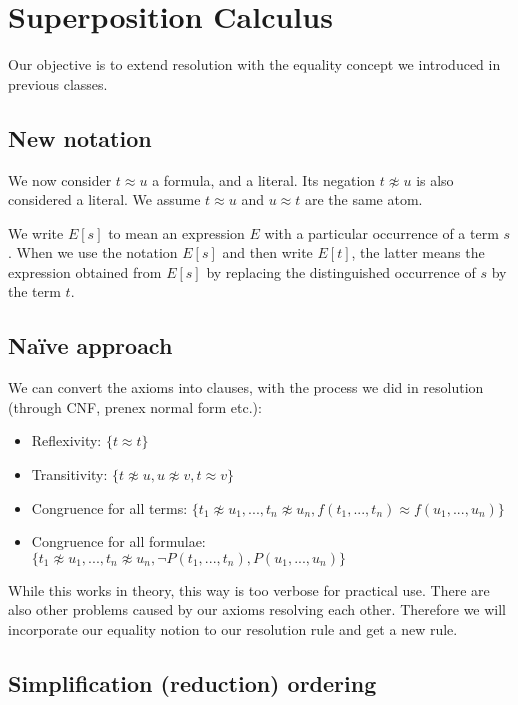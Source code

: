 \documentclass[10pt]{article}
\newcommand{\set}[1]{\{#1\}}
\begin{document}
\section{Superposition Calculus}


Our objective is to extend resolution with the equality concept we introduced in previous classes.

\subsection{New notation}
We now consider $t \approx u$ a formula, and a literal. Its negation $t \not\approx u$ is also considered a literal. We assume $t \approx u$ and $u \approx t$ are the same atom.

We write $E[s]$ to mean an expression $E$ with a particular occurrence of a term $s$. When we use the notation $E[s]$ and then write $E[t]$, the latter means the expression obtained from $E[s]$ by replacing the distinguished occurrence of $s$ by the term $t$.

\subsection{Na\"ive approach}

We can convert the axioms into clauses, with the process we did in resolution (through CNF, prenex normal form etc.):

\begin{itemize}
\item Reflexivity: $\set{t \approx t}$
\item Transitivity: $\set{t \not\approx u, u \not\approx v, t \approx v}$
\item Congruence for all terms: $\set{t_1 \not\approx u_1, ... , t_n \not\approx u_n, f(t_1,...,t_n) \approx f(u_1,...,u_n)}$
\item Congruence for all formulae: $\set{t_1 \not\approx u_1, ... , t_n \not\approx u_n, \lnot P(t_1,...,t_n), P(u_1,...,u_n)}$
\end{itemize}

While this works in theory, this way is too verbose for practical use. There are also other problems caused by our axioms resolving each other. Therefore we will incorporate our equality notion to our resolution rule and get a new rule.

\subsection{Simplification (reduction) ordering}
\end{document}
